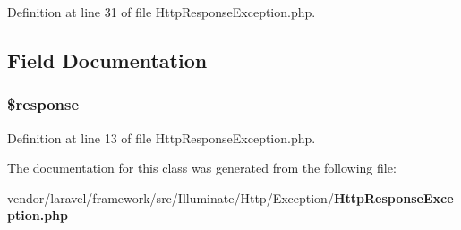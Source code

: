 Definition at line 31 of file Http\+Response\+Exception.\+php.



\subsection{Field Documentation}
\subsubsection[{\$response}]{\setlength{\rightskip}{0pt plus 5cm}\$response\hspace{0.3cm}{\ttfamily [protected]}}\label{class_illuminate_1_1_http_1_1_exception_1_1_http_response_exception_af4b6fb1bbc77ccc05f10da3b16935b99}


Definition at line 13 of file Http\+Response\+Exception.\+php.



The documentation for this class was generated from the following file\+:\begin{DoxyCompactItemize}
\item 
vendor/laravel/framework/src/\+Illuminate/\+Http/\+Exception/{\bf Http\+Response\+Exception.\+php}\end{DoxyCompactItemize}
